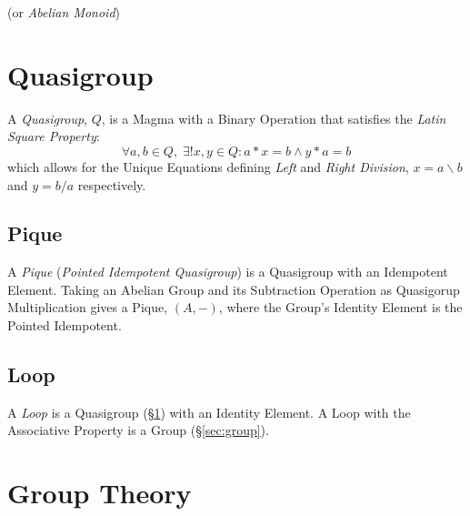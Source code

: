 (or \emph{Abelian Monoid})



\section{Quasigroup}\label{sec:quasigroup}

A \emph{Quasigroup}, $Q$, is a Magma with a Binary Operation that satisfies
the \emph{Latin Square Property}:
\[
  \forall a, b \in Q,\;\exists ! x,y \in Q : a * x = b \wedge y * a = b
\]
which allows for the Unique Equations defining \emph{Left} and
\emph{Right Division}, $x = a \backslash b$ and $y = b / a$
respectively.



\subsection{Pique}\label{sec:pique}

A \emph{Pique} (\emph{Pointed Idempotent Quasigroup}) is a Quasigroup
with an Idempotent Element. Taking an Abelian Group and its
Subtraction Operation as Quasigorup Multiplication gives a Pique,
$(A,-)$, where the Group's Identity Element is the Pointed Idempotent.



\subsection{Loop}\label{sec:quasigroup_loop}

A \emph{Loop} is a Quasigroup (\S\ref{sec:quasigroup}) with an
Identity Element. A Loop with the Associative Property is a Group
(\S\ref{sec:group}).



\section{Group Theory}\label{sec:group_theory}

